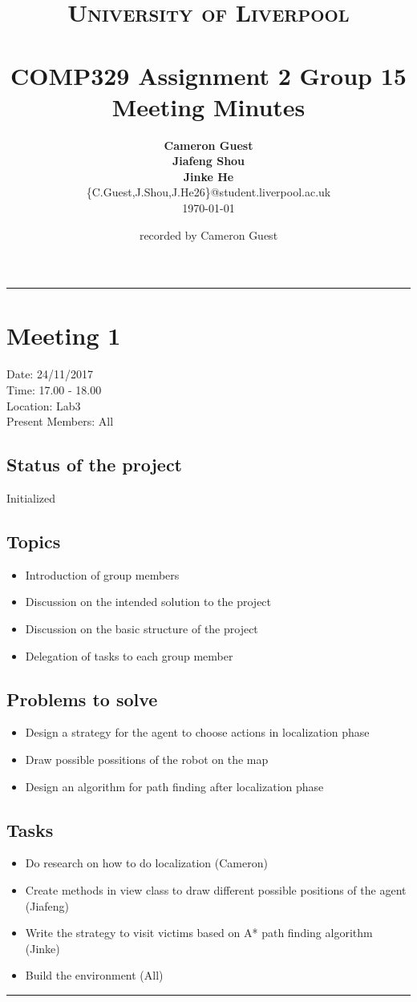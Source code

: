 \documentclass[a4paper, 12pt]{article}
\title{	
		\vspace{-1cm}
		\normalfont \normalsize \textsc{University of Liverpool} \\ [15pt]
		\horrule{2pt} \\[0.3cm]
		\large COMP329 Assignment 2 Group 15 \\ 
		\large Meeting Minutes 
		\horrule{2pt} \\
}
\author{
		\normalfont \normalsize \textbf{Cameron Guest} \\
		\normalfont \normalsize \textbf{Jiafeng Shou} \\ 
		\normalfont \normalsize \textbf{Jinke He} \\ [2pt]
		\normalfont \small \{C.Guest,J.Shou,J.He26\}@student.liverpool.ac.uk \\ [6pt]
		\normalsize \today \\
}
\date{\normalfont \normalsize recorded by Cameron Guest}
\begin{document}
\maketitle
\noindent\rule{\textwidth}{1pt}

\section*{Meeting 1}
Date: 24/11/2017 \\
Time: 17.00 - 18.00 \\
Location: Lab3 \\
Present Members: All \\

\subsection*{Status of the project}
Initialized

\subsection*{Topics}
\begin{itemize}
\item Introduction of group members
\item Discussion on the intended solution to the project
\item Discussion on the basic structure of the project
\item Delegation of tasks to each group member
\end{itemize}

\subsection*{Problems to solve}
\begin{itemize}
\item Design a strategy for the agent to choose actions in localization phase
\item Draw possible possitions of the robot on the map
\item Design an algorithm for path finding after localization phase
\end{itemize}

\subsection*{Tasks}
\begin{itemize}
\item Do research on how to do localization (Cameron)
\item Create methods in view class to draw different possible positions of the agent (Jiafeng)
\item Write the strategy to visit victims based on A* path finding algorithm (Jinke)
\item Build the environment (All)
\end{itemize}
\noindent\rule{\textwidth}{1pt}
\end{document}
